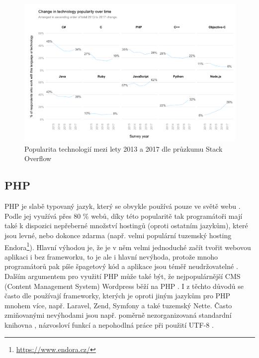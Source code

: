     \begin{figure}\centering
    	\includegraphics[width=1\textwidth]{img/stack-stats}
    	\caption[Popularita technologií mezi lety 2013 a 2017 dle průzkumu Stack Overflow]{Popularita technologií mezi lety 2013 a 2017 dle průzkumu Stack Overflow \cite{stack-stats17}}\label{fig:stack-stats17}
    \end{figure}
    
        \subsection{PHP}
        PHP je slabě typovaný jazyk, který se obvykle používá pouze ve světě webu \cite{tech-python1}. Podle \cite{tech-php1} jej využívá přes 80 \% webů, díky této popularitě tak programátoři mají také k dispozici nepřeberné množství hostingů (oproti ostatním jazykům), které jsou levné, nebo dokonce zdarma \cite{tech-python4} (např. velmi populární tuzemský hosting Endora\footnote{\url{https://www.endora.cz/}}). Hlavní výhodou je, že je v něm velmi jednoduché začít tvořit webovou aplikaci i bez frameworku, to je ale i hlavní nevýhoda, protože mnoho programátorů pak píše špagetový kód a aplikace jsou téměř neudržovatelné \cite{tech-php2}. Dalším argumentem pro využití PHP může také být, že nejpopulárnější CMS (Content Management System) Wordpress běží na PHP \cite{tech-python2}. I z těchto důvodů se často dle \cite{tech1} používají frameworky, kterých je oproti jiným jazykům pro PHP mnohem více, např. Laravel, Zend, Symfony a také tuzemský Nette. Často zmiňovanými nevýhodami jsou např. poměrně nezorganizovaná standardní knihovna \cite{tech-python1}, názvosloví funkcí a nepohodlná práce při použití UTF-8 \cite{tech-php3}.
        
